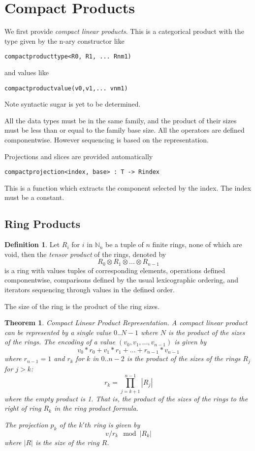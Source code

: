 \documentclass[oneside]{book}
\theoremstyle{plain}
\theoremstyle{definition}
\newtheorem{definition}{Definition}
\theoremstyle{plain}
\newtheorem{theorem}{Theorem}
\begin{document}
\section{Compact Products}
We first provide {\em compact linear products}. This is a categorical product
with the type given by the n-ary constructor like
\begin{verbatim}
compactproducttype<R0, R1, ... Rnm1)
\end{verbatim}
and values like
\begin{verbatim}
compactproductvalue(v0,v1,... vnm1)
\end{verbatim}
Note syntactic sugar is yet to be determined.

All the data types must be in the same family, and the product
of their sizes must be less than or equal to the family base size.
All the operators are defined componentwise. However sequencing
is based on the representation.

Projections and slices are provided automatically
\begin{verbatim}
compactprojection<index, base> : T -> Rindex
\end{verbatim}
This is a function which extracts the component selected
by the index. The index must be a constant.

\subsection{Ring Products}
\begin{definition}
Let $R_i$ for $i$ in $\mathbb{N}_n$ be a tuple of $n$ finite rings, none of which are void,
then the {\em tensor product} of the rings, denoted by
$$R_0 \otimes R_1 \otimes ... \otimes R_{n-1}$$
is a ring with values tuples of corresponding elements, operations
defined componentwise, comparisons defined by the usual lexicographic
ordering, and iterators sequencing through values in the defined order.
\end{definition}
The size of the ring is the product of the ring sizes.

\begin{theorem} {\em Compact Linear Product Representation}.
A compact linear product can be represented by a single value
$0..{N-1}$ where $N$ is the product of the sizes of the rings.
The encoding of a value $(v_0, v_1, ... ,v_{n-1})$ is given by
$$v_0 * r_0 + v_1 * r_1 + ... + r_{n-1} * v_{n-1}$$
where $r_{n-1}=1$ and $r_k$ for $k$ in $0..n-2$ is the product of the sizes of the rings
$R_j$ for $j>k$:
$$r_k = \prod_{j=k+1}^{n-1} |R_j|$$
where the empty product is 1. That is, the product of the sizes of the rings
to the {\em right} of ring $R_k$ in the ring product formula.

The projection $p_k$ of the $k'th$ ring is given by $$v / r_k \mod |R_k|$$
where $|R|$ is the size of the ring $R$.
\end{theorem}
\end{document}
